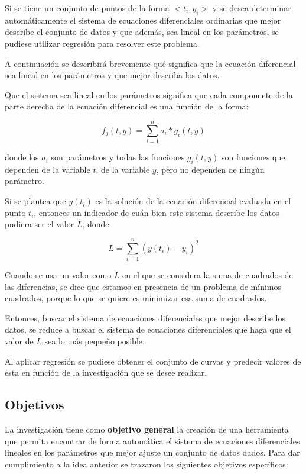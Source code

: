Si se tiene un conjunto de puntos de la forma $<t_i, y_i>$ y se desea determinar automáticamente el sistema de ecuaciones diferenciales ordinarias que mejor describe el conjunto de datos y que además, sea lineal en los parámetros, se pudiese utilizar regresión para resolver este problema.

A continuación se describirá brevemente qué significa que la ecuación diferencial sea lineal en los parámetros y que mejor describa los datos.

Que el sistema sea lineal en los parámetros significa que cada componente de la parte derecha de la ecuación diferencial es una función de la forma:

$$f_j(t,y) = \sum_{i=1}^{n} a_i * g_i(t, y)$$

donde los $a_i$ son parámetros y todas las funciones $g_i(t,y)$ son funciones que dependen de la variable $t$, de la variable $y$, pero no dependen de ningún parámetro.

Si se plantea que $y(t_i)$ es la solución de la ecuación diferencial evaluada en el punto $t_i$, entonces un indicador de cuán bien este sistema describe los datos pudiera ser el valor $L$, donde:

$$L = \sum_{i=1}^{n} (y(t_i) - y_i)^2$$

Cuando se usa un valor como $L$ en el que se considera la suma de cuadrados de las diferencias, se dice que estamos en presencia de un problema de mínimos cuadrados, porque lo que se quiere es minimizar esa suma de cuadrados.

Entonces, buscar el sistema de ecuaciones diferenciales que mejor describe los datos, se reduce a buscar el sistema de ecuaciones diferenciales que haga que el valor de $L$ sea lo más pequeño posible.

Al aplicar regresión se pudiese obtener el conjunto de curvas y predecir valores de esta en función de la investigación que se desee realizar.


\subsection*{Objetivos}

La investigación tiene como \textbf{objetivo general} la creación de una herramienta que permita encontrar de forma automática el sistema de ecuaciones diferenciales lineales en los parámetros que mejor ajuste un conjunto de datos dados. Para dar cumplimiento a la idea anterior se trazaron los siguientes objetivos específicos:


